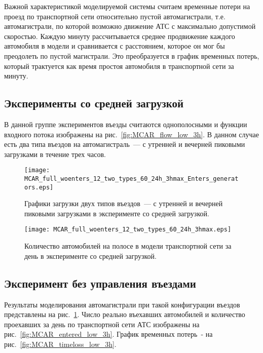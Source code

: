 Важной характеристикой моделируемой системы считаем временные потери на проезд по транспортной сети относительно пустой автомагистрали, т.е. автомагистрали, по которой возможно движение АТС с максимально допустимой скоростью.
Каждую минуту рассчитывается среднее продвижение каждого автомобиля в модели и сравнивается с расстоянием, которое он мог бы преодолеть по пустой магистрали.
Это преобразуется в график временных потерь, который трактуется как время простоя автомобиля в транспортной сети за минуту.

\subsection{Эксперименты со средней загрузкой}
\label{sec:ch5/average}
В данной группе экспериментов въезды считаются однополосными и функции входного потока изображены на рис.~\ref{fig:MCAR_flow_low_3h}.
В данном случае есть два типа въездов на автомагистраль~--- с утренней и вечерней пиковыми загрузками в течение трех часов.
\begin{figure}[ht]
    \begin{minipage}[b][][b]{0.49\textwidth}
        \centering
        \texttt{[image: MCAR\_full\_woenters\_12\_two\_types\_60\_24h\_3hmax\_Enters\_generators.eps]}
        \caption{Графики загрузки двух типов въездов~--- с утренней и вечерней пиковыми загрузками в эксперименте со средней загрузкой.}
        \label{fig:MCAR_flow_low_3h}
    \end{minipage}
    \hfill
    \begin{minipage}[b][][b]{0.49\textwidth}
        \centering
        \texttt{[image: MCAR\_full\_woenters\_12\_two\_types\_60\_24h\_3hmax.eps]}
        \caption{Количество автомобилей на полосе в модели транспортной сети за день в эксперименте со средней загрузкой.}
        \label{fig:MCAR_heatmap_low_3h}
    \end{minipage}
\end{figure}

\subsection{Эксперимент без управления въездами}
Результаты моделирования автомагистрали при такой конфигурации въездов представлены на рис.~\ref{fig:MCAR_heatmap_low_3h}.
Число реально въехавших автомобилей и количество проехавших за день по транспортной сети АТС изображены на рис.~\ref{fig:MCAR_entered_low_3h}.
График временных потерь~- на рис.~\ref{fig:MCAR_timeloss_low_3h}.


